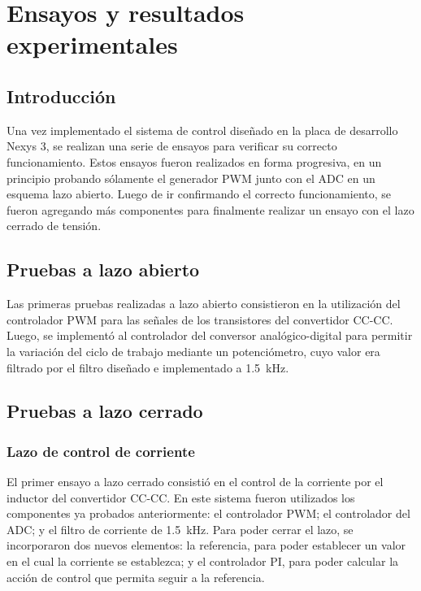 \chapter{Ensayos y resultados experimentales}

\section{Introducción}

Una vez implementado el sistema de control diseñado en la placa de desarrollo Nexys 3, se realizan una serie de ensayos para verificar su correcto funcionamiento. Estos ensayos fueron realizados en forma progresiva, en un principio probando sólamente el generador PWM junto con el ADC en un esquema lazo abierto. Luego de ir confirmando el correcto funcionamiento, se fueron agregando más componentes para finalmente realizar un ensayo con el lazo cerrado de tensión.

\section{Pruebas a lazo abierto}

Las primeras pruebas realizadas a lazo abierto consistieron en la utilización del controlador PWM para las señales de los transistores del convertidor CC-CC. Luego, se implementó al controlador del conversor analógico-digital para permitir la variación del ciclo de trabajo mediante un potenciómetro, cuyo valor era filtrado por el filtro diseñado e implementado a \SI{1.5}{\kilo\hertz}.

\section{Pruebas a lazo cerrado}

\subsection{Lazo de control de corriente}

El primer ensayo a lazo cerrado consistió en el control de la corriente por el inductor del convertidor CC-CC. En este sistema fueron utilizados los componentes ya probados anteriormente: el controlador PWM; el controlador del ADC; y el filtro de corriente de \SI{1.5}{\kilo\hertz}. Para poder cerrar el lazo, se incorporaron dos nuevos elementos: la referencia, para poder establecer un valor en el cual la corriente se establezca; y el controlador PI, para poder calcular la acción de control que permita seguir a la referencia.

